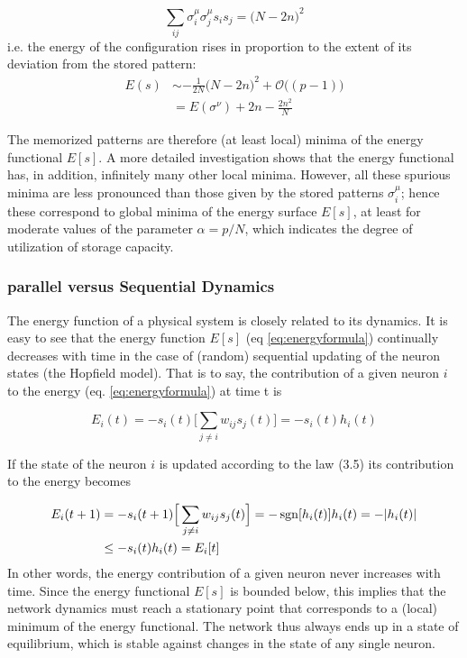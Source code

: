 \begin{equation}
    \sum_{ij}\sigma^{\mu}_{i}\sigma^{\mu}_{j}s_{i}s_{j}=\Big(N-2n\Big)^2
\end{equation}
i.e. the energy of the configuration rises in proportion to the extent of its deviation from the stored pattern:
\begin{equation}
    \begin{split}
        E(s)&\sim-\frac{1}{2N}\big(N-2n\big)^2 + \mathcal{O}\big((p-1)\big)\\
        &= E(\sigma^{\nu}) +2n-\frac{2n^2}{N}
    \end{split}
\label{eq:en2}
\end{equation}

The memorized patterns are therefore (at least local) minima of the energy functional $E[s]$.
A more detailed investigation shows that the energy functional has, in addition, infinitely many other local minima. However, all these spurious minima are less pronounced than those given by the stored patterns $\sigma^{\mu}_{i}$; hence these correspond to global minima of the energy surface $E[s]$, at least for moderate values of the parameter $\alpha = p/N$, which indicates the degree of utilization of storage capacity. 








\subsubsection{parallel versus Sequential Dynamics}
The energy function of a physical system is closely related to its dynamics. It is easy to see that the energy function $E[s]$ (eq \ref{eq:energyformula}) continually decreases with time in the case of (random) sequential updating of the neuron states (the Hopfield model). That is to say, the contribution of a given neuron $i$ to the energy (eq. \ref{eq:energyformula}) at time t is

\begin{equation}
    E_{i}(t)=-s_{i}(t)\Big[\sum_{j \neq i}w_{ij}s_{j}(t)\Big]=-s_{i}(t)h_{i}(t)
\end{equation}

If the state of the neuron $i$ is updated according to the law (3.5) its contribution to the energy becomes

\begin{equation}
\begin{split}
     E_{i}(t+1)&=-s_{i}(t+1)\Big[\sum_{j \neq i}w_{ij}s_{j}(t)\Big]=-\operatorname{sgn}[h_{i}(t)]h_{i}(t)=-|h_{i}(t)|\\
     &\leq -s_{i}(t)h_{i}(t) = E_{i}[t]
\end{split}
\end{equation}
In other words, the energy contribution of a given neuron never increases with time. Since the energy functional $E[s]$ is bounded below, this implies that the network dynamics must reach a stationary point that corresponds to a (local) minimum of the energy functional. The network thus always ends up in a state of equilibrium, which is stable against changes in the state of any single neuron.

